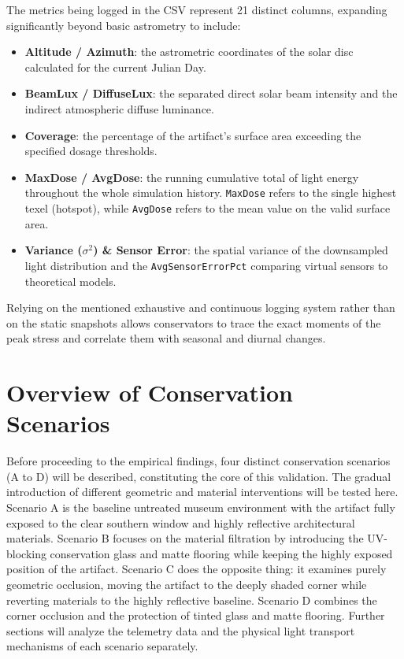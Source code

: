 The metrics being logged in the CSV represent 21 distinct columns, expanding significantly beyond basic astrometry to include:
\begin{itemize}
    \item \textbf{Altitude / Azimuth}: the astrometric coordinates of the solar disc calculated for the current Julian Day.
    \item \textbf{BeamLux / DiffuseLux}: the separated direct solar beam intensity and the indirect atmospheric diffuse luminance.
    \item \textbf{Coverage}: the percentage of the artifact's surface area exceeding the specified dosage thresholds.
    \item \textbf{MaxDose / AvgDose}: the running cumulative total of light energy throughout the whole simulation history. \texttt{MaxDose} refers to the single highest texel (hotspot), while \texttt{AvgDose} refers to the mean value on the valid surface area.
    \item \textbf{Variance ($\sigma^2$) \& Sensor Error}: the spatial variance of the downsampled light distribution and the \texttt{AvgSensorErrorPct} comparing virtual sensors to theoretical models.
\end{itemize}

Relying on the mentioned exhaustive and continuous logging system rather than on the static snapshots allows conservators to trace the exact moments of the peak stress and correlate them with seasonal and diurnal changes.

\section{Overview of Conservation Scenarios}

Before proceeding to the empirical findings, four distinct conservation scenarios (A to D) will be described, constituting the core of this validation. The gradual introduction of different geometric and material interventions will be tested here. Scenario A is the baseline untreated museum environment with the artifact fully exposed to the clear southern window and highly reflective architectural materials. Scenario B focuses on the material filtration by introducing the UV-blocking conservation glass and matte flooring while keeping the highly exposed position of the artifact. Scenario C does the opposite thing: it examines purely geometric occlusion, moving the artifact to the deeply shaded corner while reverting materials to the highly reflective baseline. Scenario D combines the corner occlusion and the protection of tinted glass and matte flooring. Further sections will analyze the telemetry data and the physical light transport mechanisms of each scenario separately.

